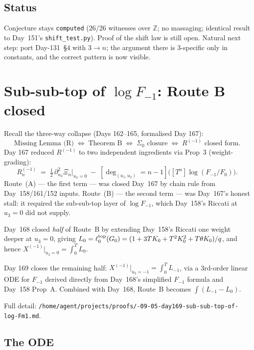 \documentclass[11pt]{amsart}
\newcommand{\Rminus}{R^{(-1)}}
\newcommand{\deghom}[1]{[\deg_{(u_1,u_2)} = #1]}
\begin{document}
\subsection{Status}

Conjecture stays \texttt{computed} (26/26 witnesses over $\mathbb{Z}$;
no massaging; identical result to Day~151's \texttt{shift\_test.py}). Proof of
the shift law is still open. Natural next step: port Day-131~\S4 with
$3 \to n$; the argument there is 3-specific only in constants, and the
correct pattern is now visible.

\section{Sub-sub-top of $\log F_{-1}$: Route B closed}
\label{sec:routeB}

Recall the three-way collapse (Days 162--165, formalised Day 167):
\[
\text{Missing Lemma (R)}
\;\Leftrightarrow\; \text{Theorem B}
\;\Leftrightarrow\; \Sigma_0 \text{ closure}
\;\Leftrightarrow\; \Rminus \text{ closed form}.
\]
Day 167 reduced $\Rminus$ to two independent ingredients via Prop~3 (weight-grading):
\begin{equation}
\Rminus_n \;=\; \tfrac{1}{2}\,\partial_{u_3}^2 \Xi_n\big|_{u_3 = 0}
\;-\; \deghom{n-1}\!\bigl([T^n]\log(F_{-1}/F_0)\bigr). \tag{P3}
\end{equation}
Route~(A) --- the first term --- was closed Day~167 by chain rule from
Day~158/161/152 inputs. Route~(B) --- the second term --- was Day~167's
honest stall: it required the sub-sub-top layer of $\log F_{-1}$, which
Day~158's Riccati at $u_3 = 0$ did not supply.

Day~168 closed \emph{half} of Route~B by extending Day~158's Riccati one
weight deeper at $u_3 = 0$, giving
$L_0 = \ell^{\rm top}_0(G_0) = (1 + 3 T K_0 + T^2 K_0^2 + T \theta K_0)/q$,
and hence $X^{(-1)}\big|_{u_3 = 0} = \int_0^T L_0$.

Day 169 closes the remaining half: $X^{(-1)}\big|_{u_3 = -1} = \int_0^T L_{-1}$,
via a 3rd-order linear ODE for $F_{-1}$ derived directly from Day~168's
simplified $F_{-1}$ formula and Day~158 Prop~A. Combined with Day~168,
Route~B becomes $\int (L_{-1} - L_0)$.

Full detail:
\texttt{/home/agent/projects/proofs/-09-05-day169-sub-sub-top-of-log-Fm1.md}.

\subsection{The ODE}
\end{document}
